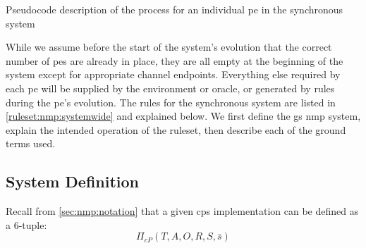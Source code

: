 \begin{algorithm}
\DontPrintSemicolon
{}
\caption[Pseudocode of the \acrlong{nmp} process in the synchronous system]{\label{alg:nmp:systemwide2}Pseudocode description of the process for an individual \gls{pe} in the synchronous system}
\end{algorithm}

While we assume before the start of the system's evolution that the correct number of \glspl{pe} are already in place, they are all empty at the beginning of the system except for appropriate channel endpoints.  Everything else required by each \gls{pe} will be supplied by the environment or oracle, or generated by rules during the \gls{pe}'s evolution.  The rules for the synchronous system are listed in \cref{ruleset:nmp:systemwide} and explained below.  We first define the \gls{gs} \gls{nmp} system, explain the intended operation of the ruleset, then describe each of the ground terms used.

\subsection{System Definition}
Recall from \cref{sec:nmp:notation} that a given \gls{cps} implementation can be defined as a 6-tuple:
\[
\Pi_{cP}(T, A, O, R, S, \bar{s})
\]

